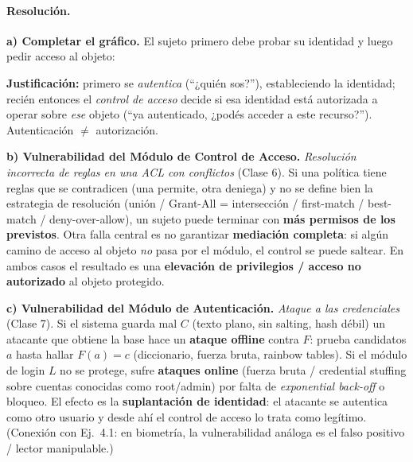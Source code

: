 \paragraph{Resolución.}

\textbf{a) Completar el gráfico.} El sujeto primero debe probar su identidad y luego pedir acceso
al objeto:
\begin{center}
\end{center}
\textbf{Justificación:} primero se \emph{autentica} (``¿quién sos?''), estableciendo la identidad;
recién entonces el \emph{control de acceso} decide si esa identidad está autorizada a operar sobre
\emph{ese} objeto (``ya autenticado, ¿podés acceder a este recurso?''). Autenticación $\neq$
autorización.

\textbf{b) Vulnerabilidad del Módulo de Control de Acceso.} \emph{Resolución incorrecta de reglas
en una ACL con conflictos} (Clase 6). Si una política tiene reglas que se contradicen (una permite,
otra deniega) y no se define bien la estrategia de resolución (unión / Grant-All = intersección /
first-match / best-match / deny-over-allow), un sujeto puede terminar con \textbf{más permisos de
los previstos}. Otra falla central es no garantizar \textbf{mediación completa}: si algún camino
de acceso al objeto \emph{no} pasa por el módulo, el control se puede saltear. En ambos casos el
resultado es una \textbf{elevación de privilegios / acceso no autorizado} al objeto protegido.

\textbf{c) Vulnerabilidad del Módulo de Autenticación.} \emph{Ataque a las credenciales} (Clase 7).
Si el sistema guarda mal $C$ (texto plano, sin salting, hash débil) un atacante que obtiene la base
hace un \textbf{ataque offline} contra $F$: prueba candidatos $a$ hasta hallar $F(a)=c$ (diccionario,
fuerza bruta, rainbow tables). Si el módulo de login $L$ no se protege, sufre \textbf{ataques
online} (fuerza bruta / credential stuffing sobre cuentas conocidas como root/admin) por falta de
\emph{exponential back-off} o bloqueo. El efecto es la \textbf{suplantación de identidad}: el
atacante se autentica como otro usuario y desde ahí el control de acceso lo trata como legítimo.
(Conexión con Ej.\ 4.1: en biometría, la vulnerabilidad análoga es el falso positivo / lector
manipulable.)
